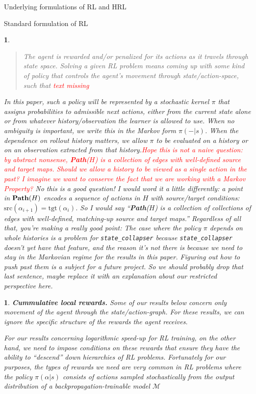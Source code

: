 \documentclass[11pt]{article}
\newtheorem{ermark}[subsubsection]{}
\begin{document}
\begin{section}{Underlying formulations of RL and HRL}
\begin{subsection}{Standard formulation of RL}
\begin{ermark}
\begin{quote}
The agent is rewarded and/or penalized for its actions as it travels through state space. {\em Solving} a given RL problem means coming up with some kind of policy that controls the agent's movement through state/action-space, such that \textcolor{red}{text missing}
\end{quote}
In this paper, such a policy will be represented by a stochastic kernel $\pi$ that assigns probabilities to admissible next actions, either from the current state alone or from whatever history/observation the learner is allowed to use. When no ambiguity is important, we write this in the Markov form $\pi(-|s)$. When the dependence on rollout history matters, we allow $\pi$ to be evaluated on a history or on an observation extracted from that history.\textcolor{red}{Hope this is not a naive question: by abstract nonsense, \textbf{Path}($H$) is a collection of edges with well-defined source and target maps. Should we allow a history to be viewed as a single action in the past? I imagine we want to conserve the fact that we are working with a Markov Property?} {\color{blue} No this is a good question! I would word it a little differently: a point in $\bold{Path}(H)$ encodes a sequence of actions in $H$ with source/target conditions: $\text{src}(\alpha_{i+1})=\text{tgt}(\alpha_{i})$. So I would say ``\textbf{Path}($H$) is a collection of {\em collections of} edges with well-defined, {\em matching-up} source and target maps.'' Regardless of all that, you're making a really good point: The case where the policy $\pi$ depends on whole histories is a problem for \texttt{state\_collapser} because \texttt{state\_collapser} doesn't yet have that feature, and the reason it's not there is because we need to stay in the Markovian regime for the results in this paper. Figuring out how to push past them is a subject for a future project. So we should probably drop that last sentence, maybe replace it with an explanation about our restricted perspective here.}
\end{ermark}
 
 \begin{ermark}
{\bf Cummulative local rewards.}
\normalfont
Some of our results below concern only movement of the agent through the state/action-graph. For these results, we can ignore the specific structure of the rewards the agent receives. 

For our results concerning logarithmic speed-up for RL training, on the other hand, we need to impose conditions on these rewards that ensure they have the ability to ``descend'' down hierarchies of RL problems. Fortunately for our purposes, the types of rewards we need are very common in RL problems where the policy $\pi(\alpha|s)$ consists of actions sampled stochastically from the output distribution of a backpropagation-trainable model $\mathcal{M}$
 \end{ermark}


\end{subsection}
\end{section}
\end{document}
